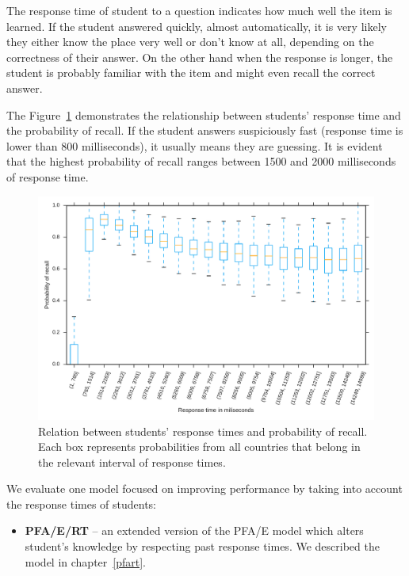 The response time of student to a question indicates how much well the item is learned. If the student answered quickly, almost automatically, it is very likely they either know the place very well or don't know at all, depending on the correctness of their answer. On the other hand when the response is longer, the student is probably familiar with the item and might even recall the correct answer.

The Figure~\ref{fig-response-time} demonstrates the relationship between students' response time and the probability of recall. If the student answers suspiciously fast (response time is lower than 800 milliseconds), it usually means they are guessing. It is evident that the highest probability of recall ranges between 1500 and 2000 milliseconds of response time.

\begin{figure}[htbp]
  \centering
  \includegraphics[width=\textwidth]{img/response-time}
  \caption{Relation between students' response times and probability of recall. Each box represents probabilities from all countries that belong in the relevant interval of response times.}
  \label{fig-response-time}
\end{figure}

We evaluate one model focused on improving performance by taking into account the response times of students:

\begin{itemize}
  \item \textbf{PFA/E/RT} -- an extended version of the PFA/E model which alters student's knowledge by respecting past response times. We described the model in chapter~\ref{pfart}.
\end{itemize}

